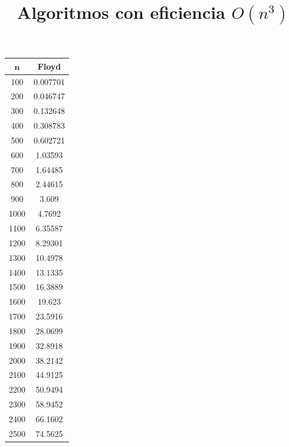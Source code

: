 \documentclass[a4]{article}
\begin{document}
\begin{table}[H]
\begin{minipage}{0.4\textwidth}
\centering
\title{\large Algoritmos con eficiencia $O(n^3)$ \\ \vspace{4mm}}
\begin{tabular}{| c c |}
\hline
$\textbf{n}$ & \textbf{Floyd} \\ \hline
  100  & 0.007701 \\ 
  200  & 0.046747 \\ 
  300  & 0.132648 \\ 
  400  & 0.308783 \\ 
  500  & 0.602721 \\ 
  600  & 1.03593  \\ 
  700  & 1.64485  \\ 
  800  & 2.44615  \\ 
  900  & 3.609    \\ 
  1000 & 4.7692   \\ 
  1100 & 6.35587  \\ 
  1200 & 8.29301  \\ 
  1300 & 10.4978  \\
  1400 & 13.1335  \\
  1500 & 16.3889  \\
  1600 & 19.623   \\
  1700 & 23.5916  \\
  1800 & 28.0699  \\
  1900 & 32.8918  \\
  2000 & 38.2142  \\
  2100 & 44.9125  \\
  2200 & 50.9494  \\
  2300 & 58.9452  \\
  2400 & 66.1602  \\
  2500 & 74.5625  \\ \hline
\end{tabular}
\end{minipage}

\hfill


\end{table}
\end{document}
